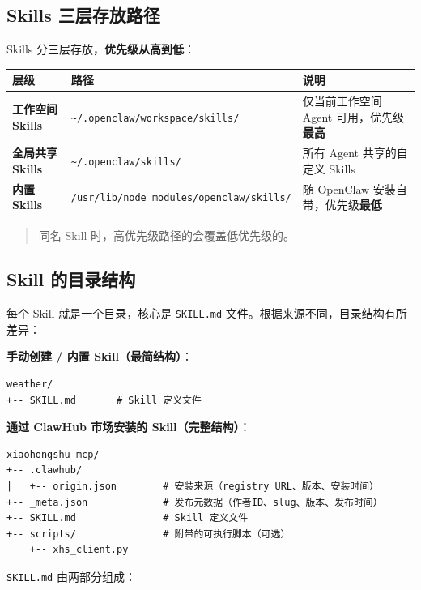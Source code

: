 \subsection{Skills 三层存放路径}


Skills 分三层存放，\textbf{优先级从高到低}：

\begin{table}[h]
\centering
\small
\begin{tabular}{|l|l|l|}
\hline
层级 & 路径 & 说明 \\
\hline
\textbf{工作空间 Skills} & \texttt{\textasciitilde{}/.openclaw/workspace/skills/} & 仅当前工作空间 Agent 可用，优先级\textbf{最高} \\
\hline
\textbf{全局共享 Skills} & \texttt{\textasciitilde{}/.openclaw/skills/} & 所有 Agent 共享的自定义 Skills \\
\hline
\textbf{内置 Skills} & \texttt{/usr/lib/node\_modules/openclaw/skills/} & 随 OpenClaw 安装自带，优先级\textbf{最低} \\
\hline
\end{tabular}
\end{table}

\begin{quote}
同名 Skill 时，高优先级路径的会覆盖低优先级的。
\end{quote}

\subsection{Skill 的目录结构}


每个 Skill 就是一个目录，核心是 \texttt{SKILL.md} 文件。根据来源不同，目录结构有所差异：

\textbf{手动创建 / 内置 Skill（最简结构）}：

\begin{lstlisting}
weather/
+-- SKILL.md       # Skill 定义文件
\end{lstlisting}

\textbf{通过 ClawHub 市场安装的 Skill（完整结构）}：

\begin{lstlisting}
xiaohongshu-mcp/
+-- .clawhub/
|   +-- origin.json        # 安装来源（registry URL、版本、安装时间）
+-- _meta.json             # 发布元数据（作者ID、slug、版本、发布时间）
+-- SKILL.md               # Skill 定义文件
+-- scripts/               # 附带的可执行脚本（可选）
    +-- xhs_client.py
\end{lstlisting}

\texttt{SKILL.md} 由两部分组成：

